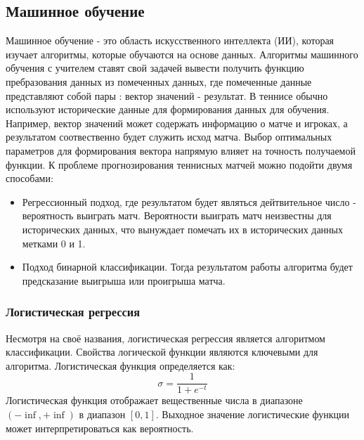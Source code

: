 \subsection{Машинное обучение}
Машинное обучение - это область искусственного интеллекта (ИИ), которая изучает алгоритмы, которые обучаются на основе данных.
Алгоритмы машинного обучения с учителем ставят свой задачей вывести получить функцию пребразования данных из помеченных данных, где помеченные данные представляют собой пары : вектор значений  - результат.
В теннисе обычно используют исторические данные для формирования данных для обучения. Например, вектор значений может содержать информацию о матче и игроках, а результатом соотвественно будет служить исход матча. Выбор оптимальных параметров для формирования вектора напрямую влияет на точность получаемой функции.
К проблеме прогнозирования теннисных матчей можно подойти двумя способами:
\begin{itemize}
	\item Регрессионный подход, где результатом будет являться дейтвительное число - вероятность выиграть матч. Вероятности выиграть матч неизвестны для исторических данных, что вынуждает помечать их в исторических данных метками 0 и 1.
	\item Подход бинарной классификации. Тогда результатом работы алгоритма будет предсказание выигрыша или проигрыша матча.
\end{itemize}
\break
\subsubsection{Логистическая регрессия}
Несмотря на своё названия, логистическая регрессия является алгоритмом классификации. Свойства логической функции являются ключевыми для алгоритма. Логистическая функция определяется как:
\begin{equation}\label{formula3}
\sigma=\frac{1}{1 + e^{-t}}
\end{equation}
Логистическая функция отображает 
вещественные числа в диапазоне $(-\inf, +\inf)$ в диапазон $[0,1]$. Выходное значение логистические функции может интерпретироваться как вероятность.

